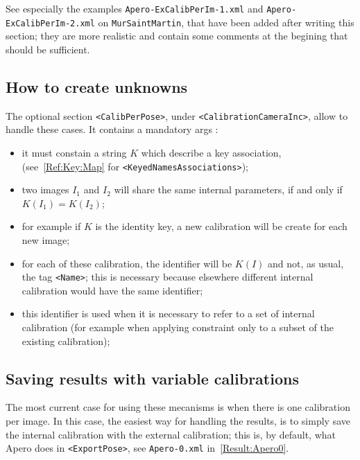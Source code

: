 See especially the examples {\tt Apero-ExCalibPerIm-1.xml} and
{\tt Apero-ExCalibPerIm-2.xml} on {\tt MurSaintMartin}, that have
been added after writing this section; they are more realistic
and contain some comments at the begining that should be
sufficient.

\subsection{How to create unknowns}

The optional section {\tt <CalibPerPose>}, under {\tt <CalibrationCameraInc>},
allow to handle these cases. It contains a mandatory args {\tt   <KeyPose2Cal>}:


\begin{itemize}
    \item it must constain a string $K$ which describe  a key association,
          (see~\ref{Ref:Key:Map}  for {\tt <KeyedNamesAssociations>});
    \item  two images  $I_1$ and $I_2$ will share the same internal parameters,
           if and only if $K(I_1) = K(I_2)$;
     \item for example  if $K$ is the identity key, a new calibration will
           be create for each new image;

     \item  for each of these calibration, the identifier will be $K(I)$ and not,
            as usual, the tag {\tt <Name>}; this is necessary because elsewhere
             different internal calibration would have the same identifier;

      \item this identifier is used when it is necessary to refer
            to a set of internal calibration (for example when applying
            constraint only to a subset of the existing calibration);

\end{itemize}

\subsection{Saving  results with  variable calibrations}

The most current case for using these mecanisms is when there is one calibration
per image. In this case, the easiest way for handling the results, is  to
simply  save the internal calibration  with the external calibration;
this is, by default, what Apero does  in {\tt <ExportPose>}, see
{\tt Apero-0.xml} in~\ref{Result:Apero0}.



